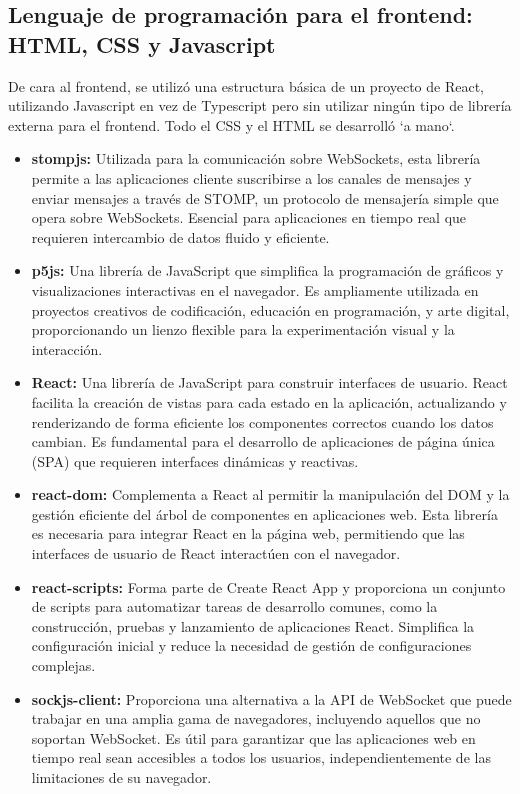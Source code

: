 \subsection{Lenguaje de programación para el frontend: HTML, CSS y Javascript}
De cara al frontend, se utilizó una estructura básica de un proyecto de React, utilizando Javascript en vez de Typescript pero sin utilizar ningún tipo de librería externa para el frontend. Todo el CSS y el HTML se desarrolló `a mano`.
\begin{itemize}
    \item \textbf{stompjs:}\cite{stompjsFrontend} Utilizada para la comunicación sobre WebSockets, esta librería permite a las aplicaciones cliente suscribirse a los canales de mensajes y enviar mensajes a través de STOMP, un protocolo de mensajería simple que opera sobre WebSockets. Esencial para aplicaciones en tiempo real que requieren intercambio de datos fluido y eficiente.
    \item \textbf{p5js:}\cite{p5js} Una librería de JavaScript que simplifica la programación de gráficos y visualizaciones interactivas en el navegador. Es ampliamente utilizada en proyectos creativos de codificación, educación en programación, y arte digital, proporcionando un lienzo flexible para la experimentación visual y la interacción.
    
    \item \textbf{React:}\cite{React} Una librería de JavaScript para construir interfaces de usuario. React facilita la creación de vistas para cada estado en la aplicación, actualizando y renderizando de forma eficiente los componentes correctos cuando los datos cambian. Es fundamental para el desarrollo de aplicaciones de página única (SPA) que requieren interfaces dinámicas y reactivas.
    
    \item \textbf{react-dom:}\cite{ReactDOM} Complementa a React al permitir la manipulación del DOM y la gestión eficiente del árbol de componentes en aplicaciones web. Esta librería es necesaria para integrar React en la página web, permitiendo que las interfaces de usuario de React interactúen con el navegador.
    
    \item \textbf{react-scripts:}\cite{ReactScripts} Forma parte de Create React App y proporciona un conjunto de scripts para automatizar tareas de desarrollo comunes, como la construcción, pruebas y lanzamiento de aplicaciones React. Simplifica la configuración inicial y reduce la necesidad de gestión de configuraciones complejas.
    
    \item \textbf{sockjs-client:}\cite{SockJSClient} Proporciona una alternativa a la API de WebSocket que puede trabajar en una amplia gama de navegadores, incluyendo aquellos que no soportan WebSocket. Es útil para garantizar que las aplicaciones web en tiempo real sean accesibles a todos los usuarios, independientemente de las limitaciones de su navegador.
\end{itemize}

